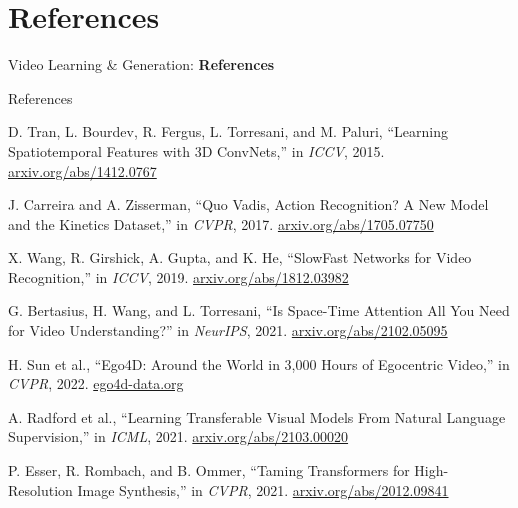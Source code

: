 \section{References}
\begin{frame}{}
    \LARGE Video Learning \& Generation: \textbf{References}
\end{frame}

\begin{frame}[allowframebreaks]{References}
    \small
    \begin{thebibliography}{13}
        D. Tran, L. Bourdev, R. Fergus, L. Torresani, and M. Paluri,
        \newblock ``Learning Spatiotemporal Features with 3D ConvNets,''
        \newblock in \emph{ICCV}, 2015.
        \newblock \href{https://arxiv.org/abs/1412.0767}{arxiv.org/abs/1412.0767}

        J. Carreira and A. Zisserman,
        \newblock ``Quo Vadis, Action Recognition? A New Model and the Kinetics Dataset,''
        \newblock in \emph{CVPR}, 2017.
        \newblock \href{https://arxiv.org/abs/1705.07750}{arxiv.org/abs/1705.07750}

        X. Wang, R. Girshick, A. Gupta, and K. He,
        \newblock ``SlowFast Networks for Video Recognition,''
        \newblock in \emph{ICCV}, 2019.
        \newblock \href{https://arxiv.org/abs/1812.03982}{arxiv.org/abs/1812.03982}

        G. Bertasius, H. Wang, and L. Torresani,
        \newblock ``Is Space-Time Attention All You Need for Video Understanding?''
        \newblock in \emph{NeurIPS}, 2021.
        \newblock \href{https://arxiv.org/abs/2102.05095}{arxiv.org/abs/2102.05095}

        H. Sun et al.,
        \newblock ``Ego4D: Around the World in 3,000 Hours of Egocentric Video,''
        \newblock in \emph{CVPR}, 2022.
        \newblock \href{https://ego4d-data.org/}{ego4d-data.org}

        A. Radford et al.,
        \newblock ``Learning Transferable Visual Models From Natural Language Supervision,''
        \newblock in \emph{ICML}, 2021.
        \newblock \href{https://arxiv.org/abs/2103.00020}{arxiv.org/abs/2103.00020}

        P. Esser, R. Rombach, and B. Ommer,
        \newblock ``Taming Transformers for High-Resolution Image Synthesis,''
        \newblock in \emph{CVPR}, 2021.
        \newblock \href{https://arxiv.org/abs/2012.09841}{arxiv.org/abs/2012.09841}


\end{thebibliography}
\end{frame}
